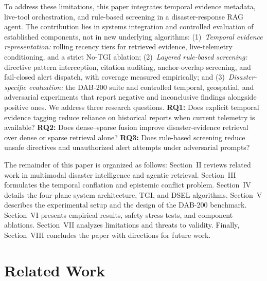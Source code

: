 \documentclass[conference]{IEEEtran}
\begin{document}
To address these limitations, this paper integrates temporal evidence metadata, live-tool orchestration, and rule-based screening in a disaster-response RAG agent. The contribution lies in systems integration and controlled evaluation of established components, not in new underlying algorithms:
(1)~\textit{Temporal evidence representation:} rolling recency tiers for retrieved evidence, live-telemetry conditioning, and a strict No-TGI ablation; (2)~\textit{Layered rule-based screening:} directive pattern interception, citation auditing, anchor-overlap screening, and fail-closed alert dispatch, with coverage measured empirically; and (3)~\textit{Disaster-specific evaluation:} the DAB-200 suite \cite{dab200} and controlled temporal, geospatial, and adversarial experiments that report negative and inconclusive findings alongside positive ones.
We address three research questions. \textbf{RQ1:} Does explicit temporal evidence tagging reduce reliance on historical reports when current telemetry is available? \textbf{RQ2:} Does dense--sparse fusion improve disaster-evidence retrieval over dense or sparse retrieval alone? \textbf{RQ3:} Does rule-based screening reduce unsafe directives and unauthorized alert attempts under adversarial prompts?

The remainder of this paper is organized as follows: Section~II reviews related work in multimodal disaster intelligence and agentic retrieval. Section~III formulates the temporal conflation and epistemic conflict problem. Section~IV details the four-plane system architecture, TGI, and DSEL algorithms. Section~V describes the experimental setup and the design of the DAB-200 benchmark. Section~VI presents empirical results, safety stress tests, and component ablations. Section~VII analyzes limitations and threats to validity. Finally, Section~VIII concludes the paper with directions for future work.

\section{Related Work}
\end{document}

